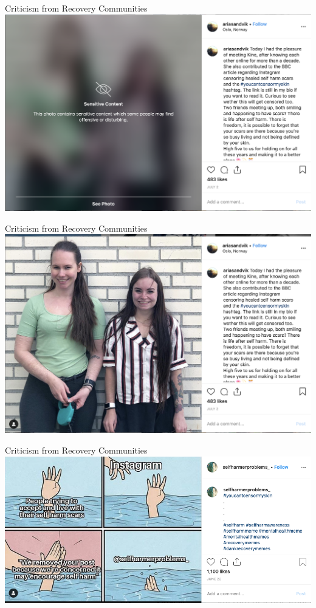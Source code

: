 \documentclass[nobackground,dvipsnames,table]{beamer}
\begin{document}
\begin{frame}{Criticism from Recovery Communities}
    \includegraphics[width=\textwidth]{recovery-community-criticism-1}
\end{frame}

\begin{frame}{Criticism from Recovery Communities}
    \includegraphics[width=\textwidth]{recovery-community-criticism-2}
\end{frame}

\begin{frame}{Criticism from Recovery Communities}
    \includegraphics[width=\textwidth]{recovery-community-criticism-3}
\end{frame}
\end{document}
